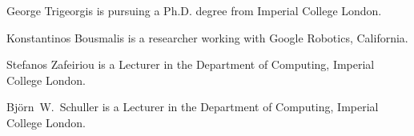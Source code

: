 \documentclass[10pt,journal,compsoc]{IEEEtran}
\begin{document}


\vspace{-1.3cm}
\begin{IEEEbiographynophoto}{George Trigeorgis}
 is pursuing a Ph.D. degree from Imperial College London.
\end{IEEEbiographynophoto}
\vspace{-1.2cm}
\begin{IEEEbiographynophoto}{Konstantinos Bousmalis}
is a researcher working with Google Robotics, California.
\end{IEEEbiographynophoto}
\vspace{-1.2cm}
\begin{IEEEbiographynophoto}{Stefanos Zafeiriou}
is a Lecturer in the Department of Computing, Imperial College London.
\end{IEEEbiographynophoto}
\vspace{-1.2cm}
\begin{IEEEbiographynophoto}{Bj\"orn~W.~Schuller}
is a Lecturer in the Department of Computing, Imperial College London.
\end{IEEEbiographynophoto}





\vfill
\end{document}
